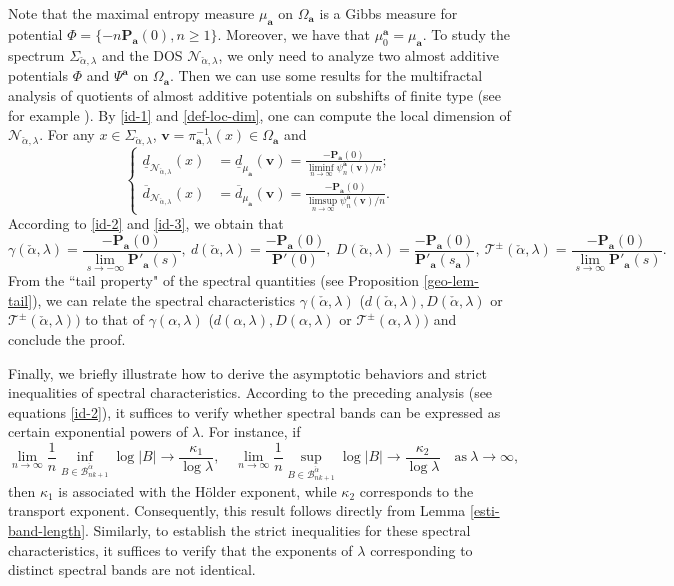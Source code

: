 \documentclass[reqno,11pt,graphicx,]{amsart}
\numberwithin{equation}{section}
\theoremstyle{plain}
\newcommand{\p}{\mathbf P}
\newcommand{\3}{\mathbf{3}}
\newcommand{\ma}{\mathbf{a}}
\newcommand{\mv}{\mathbf{v}}
\begin{document}
	Note that the maximal entropy measure $\mu_{\ma}$ on $\Omega_{\ma}$ is a Gibbs measure for potential $\Phi=\{-n\p_{\ma}(0),n\geq1\}$. Moreover, we have that $\mu^{\ma}_0=\mu_{\ma}$. To study the spectrum $\Sigma_{\check{\alpha},\lambda}$ and the DOS $\mathcal{N}_{\check{\alpha},\lambda}$, we only need to analyze two almost additive potentials $\Phi$ and $\Psi^{\ma}$ on $\Omega_{\ma}$. Then we can use some results for the multifractal analysis of quotients of almost additive potentials on subshifts of finite type (see for example \cite{BQ2012,FH2010}). By \eqref{id-1} and \eqref{def-loc-dim}, one can compute the local dimension of $\mathcal{N}_{\check{\alpha},\lambda}$. For  any $x\in\Sigma_{\check{\alpha},\lambda}$, $\mv=\pi_{\ma,\lambda}^{-1}(x)\in\Omega_{\ma}$ and
	\begin{equation}\label{id-3}
		\left\{ \begin{aligned}
			\underline{d}_{\mathcal{N}_{\check{\alpha},\lambda}}(x)&=	\underline{d}_{\mu_{\ma}}(\mv)=\frac{-\p_{\ma}(0)}{\liminf\limits_{n\to\infty}\psi^{\ma}_n(\mv)/n};\\
			\overline{d}_{\mathcal{N}_{\check{\alpha},\lambda}}(x)&=\overline{d}_{\mu_{\ma}}(\mv)=\frac{-\p_{\ma}(0)}{\limsup\limits_{n\to\infty}\psi^{\ma}_n(\mv)/n}.
		\end{aligned}
		\right. 
	\end{equation}
	According to \eqref{id-2} and \eqref{id-3}, we obtain that 
	\begin{equation*}
		\gamma(\check{\alpha},\lambda)=\frac{-\p_{\ma}(0)}{\lim\limits_{s\to-\infty}\p'_{\ma}(s)},\ d(\check{\alpha},\lambda)=\frac{-\p_{\ma}(0)}{\p'(0)},\
		D(\check{\alpha},\lambda)=\frac{-\p_{\ma}(0)}{\p'_{\ma}(s_{\ma})},\  \mathcal{T}^{\pm}(\check{\alpha},\lambda)=\frac{-\p_{\ma}(0)}{\lim\limits_{s\to\infty}\p'_{\ma}(s)}.
	\end{equation*}
	From the ``tail property" of the spectral quantities (see Proposition \ref{geo-lem-tail}), we can relate the spectral characteristics $\gamma(\check{\alpha},\lambda)$ ($d(\check{\alpha},\lambda), D(\check{\alpha},\lambda)$ or $ \mathcal{T}^{\pm}(\check{\alpha},\lambda))$ to that of $\gamma(\alpha,\lambda)$ ($d(\alpha,\lambda), D(\alpha,\lambda)$ or $\mathcal{T}^{\pm}(\alpha,\lambda))$ and conclude the proof.
	
	Finally, we briefly illustrate how to derive the asymptotic behaviors and strict inequalities of spectral characteristics. According to the preceding analysis (see equations \eqref{id-2}), it suffices to verify whether spectral bands can be expressed as certain exponential powers of $\lambda$. For instance, if
	$$
	\lim_{n\to\infty}\frac{1}{n}\inf_{B\in\mathcal{B}^{\check{\alpha}}_{nk+1}}\log|B|\to\frac{\kappa_1}{\log\lambda},
	\quad
	\lim_{n\to\infty}\frac{1}{n}\sup_{B\in\mathcal{B}^{\check{\alpha}}_{nk+1}}\log|B|\to\frac{\kappa_2}{\log\lambda}
	\quad\text{as}\ \lambda\to\infty,
	$$
	then $\kappa_1$ is associated with the H\"older exponent, while $\kappa_2$ corresponds to the transport exponent. Consequently, this result follows directly from Lemma \ref{esti-band-length}. Similarly, to establish the strict inequalities for these spectral characteristics, it suffices to verify that the exponents of $\lambda$ corresponding to distinct spectral bands are not identical.
	
\end{document}
